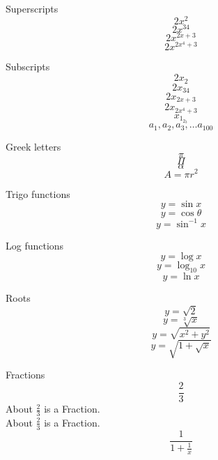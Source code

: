 \documentclass[11pt]{article}
\begin{document}
Superscripts
$$2x^2$$
$$2x^{34}$$
$$2x^{2x+3}$$
$$2x^{2x^4+3}$$

Subscripts
$$2x_2$$
$$2x_{34}$$
$$2x_{2x+3}$$
$$2x_{2x^4+3}$$
$$x_{1_{2_3}}$$
$$a_1,a_2,a_3,\ldots a_{100}$$

Greek letters
$$\pi$$
$$\Pi$$
$$\alpha$$
$$A=\pi r^2$$

Trigo functions
$$y=\sin x$$
$$y =\cos \theta$$
$$y = \sin^{-1} x$$

Log functions
$$y=\log x$$
$$y=\log_{10} x$$
$$y=\ln x$$

Roots
$$y=\sqrt{2}$$
$$y=\sqrt[3]{x}$$
$$y=\sqrt{x^2+y^2}$$
$$y=\sqrt{ 1+\sqrt{x}  }$$

Fractions
$$\frac{2}{3}$$
About $\frac{2}{3}$ is a Fraction.\\[11pt]
About $\displaystyle \frac{2}{3}$ is a Fraction.
$$\frac{1}{1+\frac{1}{x}}$$
\end{document}
